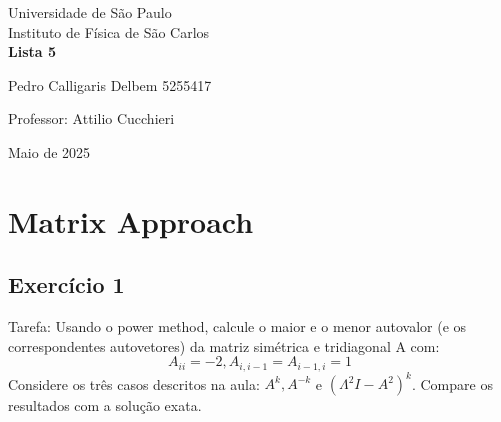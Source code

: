 \documentclass[12pt, a4paper]{article} %
\begin{document}
	
	\begin{titlepage}
		\begin{center}
\Huge{Universidade de São Paulo}\\
\large{Instituto de Física de São Carlos}\\
\vspace{20pt}
\vspace{200pt}
\textbf{Lista 5}\\
\vspace{8cm}
		\end{center}

\begin{flushleft}
\begin{tabbing}
Pedro Calligaris Delbem 5255417\\
\end{tabbing}
\vspace{0.5cm}
Professor: Attilio Cucchieri\\		
		\end{flushleft}
	
		\begin{center}
			\vspace{\fill}
	Maio de 2025	
		\end{center}
	\end{titlepage}

	\tableofcontents 
	\thispagestyle{empty}
	\newpage

\section{Matrix Approach}

    \subsection{Exerc\'icio 1}

        Tarefa: Usando o power method, calcule o maior e o menor autovalor (e os correspondentes
        autovetores) da matriz sim\'etrica e tridiagonal A com:
        \begin{equation*}
            A_{ii} = -2,  A_{i,i-1} = A_{i-1,i} = 1
        \end{equation*}
        Considere os tr\^es casos descritos na aula: \(A^k, A^{-k}\) e \((\Lambda^2 I - A^2)^k \).
        Compare os resultados com a solu\c{c}\~ao exata.
\end{document}
